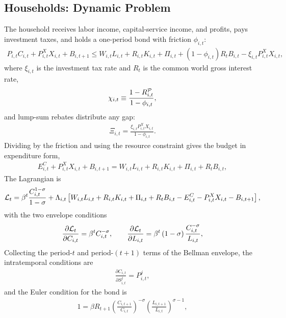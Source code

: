 \documentclass[10pt]{article}
\begin{document}
\subsection*{Households: Dynamic Problem}
The household receives labor income, capital-service income, and profits, pays
investment taxes, and holds a one-period bond with friction $\phi_{i,t}$:
\begin{align}
  P_{i,t} C_{i,t} + P^{X}_{i,t} X_{i,t} + B_{i,t+1} \le
  W_{i,t} L_{i,t} + R_{i,t} K_{i,t} + \Pi_{i,t}
  + \left( 1 - \phi_{i,t} \right) R_{t} B_{i,t} - \xi_{i,t} P^{X}_{i,t} X_{i,t},
  \label{eq:bc}
\end{align}
where $\xi_{i,t}$ is the investment tax rate and $R_{t}$ is the common world gross
interest rate,
\begin{align}
  \chi_{i,t} \equiv \frac{1 - R^{\cal P}_{i,t}}{1 - \phi_{i,t}}, \label{eq:chi-def}
\end{align}
and lump-sum rebates distribute any gap:
\begin{align}
  \Xi_{i,t} = \frac{\xi_{i,t} P^{X}_{i,t} X_{i,t}}{1 - \phi_{i,t}}. \label{eq:rebate}
\end{align}
Dividing by the friction and using the resource constraint gives the budget in
expenditure form,
\begin{align}
  E^C_{i,t} + P^{X}_{i,t} X_{i,t} + B_{i,t+1} = W_{i,t} L_{i,t} + R_{i,t} K_{i,t}
  + \Pi_{i,t} + R_{t} B_{i,t}, \label{eq:bc-resource}
\end{align}
The Lagrangian is
\begin{align}
  {\cal L}_t = \beta^t \frac{C^{1 - \sigma}_{i,t}}{1 - \sigma} +
  \Lambda_{i,t} \left[ W_{i,t} L_{i,t} + R_{i,t} K_{i,t} + \Pi_{i,t}
  + R_{t} B_{i,t} - E^C_{i,t} - P^{X}_{i,t} X_{i,t} - B_{i,t+1} \right],
  \label{eq:lagrangian}
\end{align}
with the two envelope conditions
\begin{align}
  \frac{\partial {\cal L}_t}{\partial C_{i,t}} = \beta^t C^{-\sigma}_{i,t},
  \qquad
  \frac{\partial {\cal L}_t}{\partial L_{i,t}} = \beta^t
  \left( 1 - \sigma \right) \frac{C^{-\sigma}_{i,t}}{L_{i,t}}, \label{eq:dEdC}
\end{align}
Collecting the period-$t$ and period-$(t+1)$ terms of the Bellman envelope, the
intratemporal conditions are
\begin{align}
  \frac{\partial C_{i,t}}{\partial S^j_{i,t}} = P^j_{i,t}, \label{eq:lambda-dyn}
\end{align}
and the Euler condition for the bond is
\begin{align}
  1 = \beta R_{t+1} \left( \frac{C_{i,t+1}}{C_{i,t}} \right)^{-\sigma}
  \left( \frac{L_{i,t+1}}{L_{i,t}} \right)^{\sigma - 1}, \label{eq:euler}
\end{align}
\end{document}
